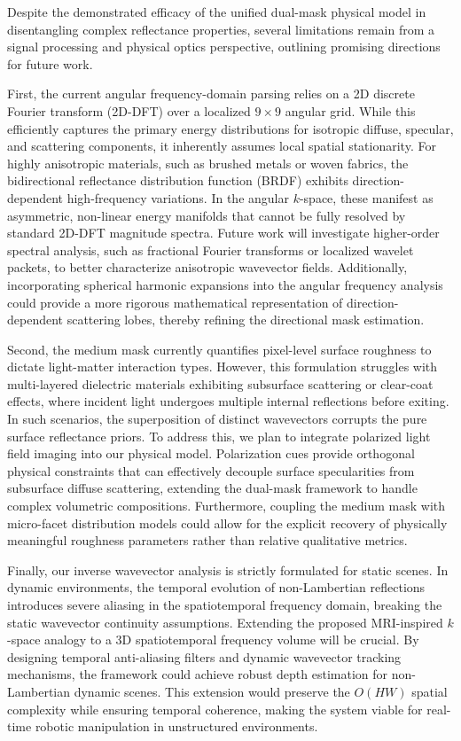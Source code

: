 Despite the demonstrated efficacy of the unified dual-mask physical model in disentangling complex reflectance properties, several limitations remain from a signal processing and physical optics perspective, outlining promising directions for future work.

First, the current angular frequency-domain parsing relies on a 2D discrete Fourier transform (2D-DFT) over a localized $9 \times 9$ angular grid. While this efficiently captures the primary energy distributions for isotropic diffuse, specular, and scattering components, it inherently assumes local spatial stationarity. For highly anisotropic materials, such as brushed metals or woven fabrics, the bidirectional reflectance distribution function (BRDF) exhibits direction-dependent high-frequency variations. In the angular $k$-space, these manifest as asymmetric, non-linear energy manifolds that cannot be fully resolved by standard 2D-DFT magnitude spectra. Future work will investigate higher-order spectral analysis, such as fractional Fourier transforms or localized wavelet packets, to better characterize anisotropic wavevector fields. Additionally, incorporating spherical harmonic expansions into the angular frequency analysis could provide a more rigorous mathematical representation of direction-dependent scattering lobes, thereby refining the directional mask estimation.

Second, the medium mask currently quantifies pixel-level surface roughness to dictate light-matter interaction types. However, this formulation struggles with multi-layered dielectric materials exhibiting subsurface scattering or clear-coat effects, where incident light undergoes multiple internal reflections before exiting. In such scenarios, the superposition of distinct wavevectors corrupts the pure surface reflectance priors. To address this, we plan to integrate polarized light field imaging into our physical model. Polarization cues provide orthogonal physical constraints that can effectively decouple surface specularities from subsurface diffuse scattering, extending the dual-mask framework to handle complex volumetric compositions. Furthermore, coupling the medium mask with micro-facet distribution models could allow for the explicit recovery of physically meaningful roughness parameters rather than relative qualitative metrics.

Finally, our inverse wavevector analysis is strictly formulated for static scenes. In dynamic environments, the temporal evolution of non-Lambertian reflections introduces severe aliasing in the spatiotemporal frequency domain, breaking the static wavevector continuity assumptions. Extending the proposed MRI-inspired $k$-space analogy to a 3D spatiotemporal frequency volume will be crucial. By designing temporal anti-aliasing filters and dynamic wavevector tracking mechanisms, the framework could achieve robust depth estimation for non-Lambertian dynamic scenes. This extension would preserve the $O(HW)$ spatial complexity while ensuring temporal coherence, making the system viable for real-time robotic manipulation in unstructured environments.